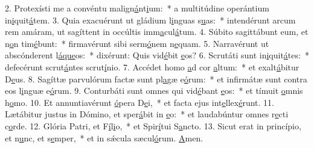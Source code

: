 2. Protexísti me a convéntu malign\uline{á}nt\uline{i}um:~* a multitúdine operántium in\uline{i}quit\uline{á}tem.
3. Quia exacuérunt ut gládium l\uline{i}nguas s\uline{u}as:~* intendérunt arcum rem amáram, ut sagíttent in occúltis imm\uline{a}cul\uline{á}tum.
4. Súbito sagittábunt eum, et n\uline{o}n tim\uline{é}bunt:~* firmavérunt sibi serm\uline{ó}nem n\uline{e}quam.
5. Narravérunt ut abscónderent l\uline{á}\uline{que}os:~* dixérunt: Quis vid\uline{é}bit \uline{e}os?
6. Scrutáti sunt in\uline{i}quit\uline{á}tes:~* defecérunt scrut\uline{á}ntes scrut\uline{í}nio.
7. Accédet homo \uline{a}d cor \uline{a}ltum:~* et exalt\uline{á}bitur D\uline{e}us.
8. Sagíttæ parvulórum factæ sunt pl\uline{a}gæ e\uline{ó}rum:~* et infirmátæ sunt contra eos l\uline{i}nguæ e\uline{ó}rum.
9. Conturbáti sunt omnes qui vid\uline{é}bant \uline{e}os:~* et tímuit \uline{o}mnis h\uline{o}mo.
10. Et annuntiavérunt \uline{ó}pera D\uline{e}i,~* et facta ejus int\uline{e}llex\uline{é}runt.
11. Lætábitur justus in Dómino, et sper\uline{á}bit in \uline{e}o:~* et laudabúntur omnes r\uline{e}cti c\uline{o}rde.
12. Glória Patri, et F\uline{í}l\uline{i}o,~* et Spir\uline{í}tui S\uline{a}ncto.
13. Sicut erat in princípio, et n\uline{u}nc, et s\uline{e}mper,~* et in sǽcula sæcul\uline{ó}rum. \uline{A}men.
